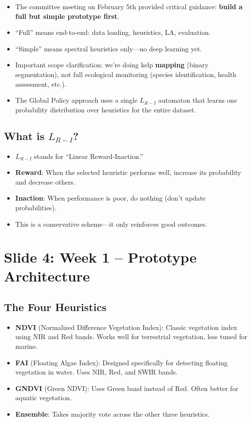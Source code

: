 \documentclass[11pt]{article}
\newenvironment{talkingpoints}{%
  \begin{itemize}[leftmargin=1.5em, itemsep=0.3em]
}{%
  \end{itemize}
}
\begin{document}
\begin{talkingpoints}
  \item The committee meeting on February 5th provided critical guidance: \textbf{build a full but simple prototype first}.
  \item ``Full'' means end-to-end: data loading, heuristics, LA, evaluation.
  \item ``Simple'' means spectral heuristics only---no deep learning yet.
  \item Important scope clarification: we're doing kelp \textbf{mapping} (binary segmentation), not full ecological monitoring (species identification, health assessment, etc.).
  \item The Global Policy approach uses a single $L_{R-I}$ automaton that learns one probability distribution over heuristics for the entire dataset.
\end{talkingpoints}

\subsection{What is $L_{R-I}$?}

\begin{talkingpoints}
  \item $L_{R-I}$ stands for ``Linear Reward-Inaction.''
  \item \textbf{Reward}: When the selected heuristic performs well, increase its probability and decrease others.
  \item \textbf{Inaction}: When performance is poor, do nothing (don't update probabilities).
  \item This is a conservative scheme---it only reinforces good outcomes.
\end{talkingpoints}

\section{Slide 4: Week 1 -- Prototype Architecture}

\subsection{The Four Heuristics}

\begin{talkingpoints}
  \item \textbf{NDVI} (Normalized Difference Vegetation Index): Classic vegetation index using NIR and Red bands. Works well for terrestrial vegetation, less tuned for marine.
  \item \textbf{FAI} (Floating Algae Index): Designed specifically for detecting floating vegetation in water. Uses NIR, Red, and SWIR bands.
  \item \textbf{GNDVI} (Green NDVI): Uses Green band instead of Red. Often better for aquatic vegetation.
  \item \textbf{Ensemble}: Takes majority vote across the other three heuristics.
\end{talkingpoints}
\end{document}
